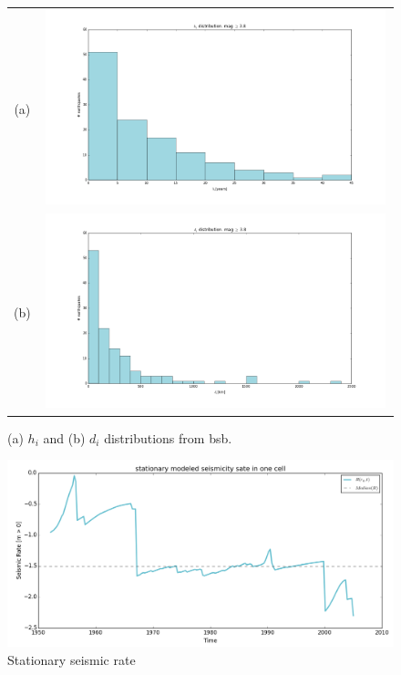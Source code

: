 \documentclass[draft, grl]{agutex}
\begin{document}

\begin{figure}
	\begin{center}
	\begin{table}[H]
		\begin{tabular}{ c c }
		\footnotesize(a)
		& \includegraphics[width=0.99\textwidth]{z_img_hi_histogram}
		\\
		\footnotesize(b)
        & \includegraphics[width=0.99\textwidth]{z_img_di_histogram}
		\end{tabular}
	\end{table}
	\caption{(a) $h_i$ and (b) $d_i$ distributions from \gls{bsb}.}
	\label{fig_hidi_histogram}
	\end{center}
\end{figure}



\begin{figure}
	\includegraphics[width=0.99\linewidth]{z_img_helmstetter_stationary_a}
	\caption{Stationary seismic rate}
	\label{fig_helmstetter_stationary_rate}
\end{figure}
\end{document}
